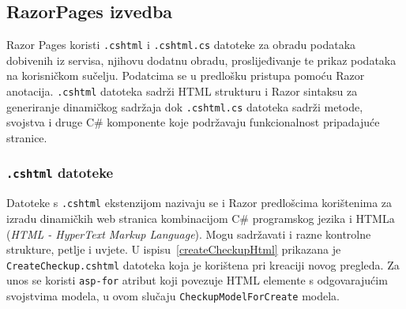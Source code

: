 \subsection{RazorPages izvedba}
\label{subsec:izvedbaRP}

Razor Pages koristi \texttt{.cshtml} i \texttt{.cshtml.cs} datoteke za obradu podataka dobivenih iz servisa, njihovu dodatnu obradu, proslijeđivanje te prikaz podataka na korisničkom sučelju. Podatcima se u predlošku pristupa pomoću Razor anotacija. \texttt{.cshtml} datoteka sadrži HTML strukturu i Razor sintaksu za generiranje dinamičkog sadržaja dok \texttt{.cshtml.cs} datoteka sadrži metode, svojstva i druge C\# komponente koje podržavaju funkcionalnost pripadajuće stranice.
\subsubsection{\texttt{.cshtml} datoteke}
\label{subsubsec:.cshtml}
Datoteke s \texttt{.cshtml} ekstenzijom nazivaju se i Razor predlošcima korištenima za izradu dinamičkih web stranica kombinacijom C\# programskog jezika i HTMLa (\textit{HTML - HyperText Markup Language}). Mogu sadržavati i razne kontrolne strukture, petlje i uvjete. U ispisu~\ref{createCheckupHtml} prikazana je \texttt{CreateCheckup.cshtml} datoteka koja je korištena pri kreaciji novog pregleda. Za unos se koristi \texttt{asp-for} atribut koji povezuje HTML elemente s odgovarajućim svojstvima modela, u ovom slučaju \texttt{CheckupModelForCreate} modela.

